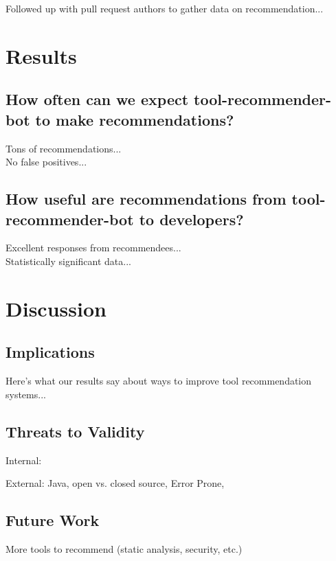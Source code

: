 \documentclass[conference]{IEEEtran}
\newcommand{\tool}{tool-recommender-bot }
\begin{document}
Followed up with pull request authors to gather data on recommendation...

\section{Results}

\subsection{How often can we expect \tool to make recommendations?}

Tons of recommendations... \\

No false positives... \\

\subsection{How useful are recommendations from \tool to developers?}

Excellent responses from recommendees...\\

Statistically significant data...

\section{Discussion}

\subsection{Implications}

Here's what our results say about ways to improve tool recommendation systems...

\subsection{Threats to Validity}

Internal: 

External: Java, open vs. closed source, Error Prone,

\subsection{Future Work}

More tools to recommend (static analysis, security, etc.) \\
\end{document}
